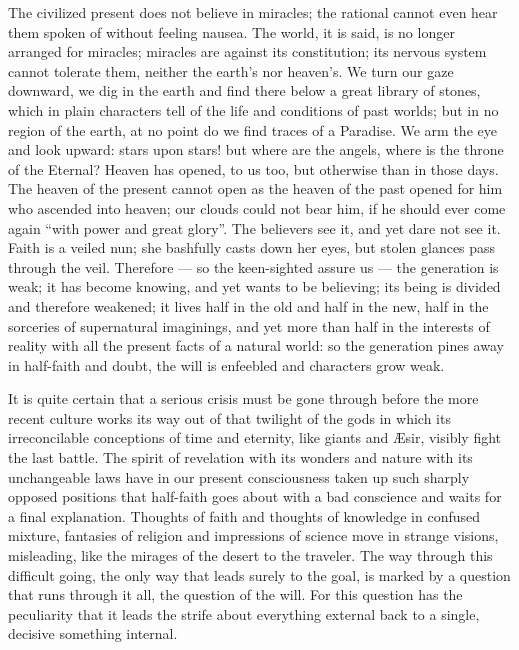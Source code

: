 \documentclass[12pt,a4paper,openany]{book}
\newcommand{\opage}[1]{\marginnote{\footnotesize\textit{[#1]}}}
\begin{document}
The civilized present does not believe in miracles; the
rational cannot even hear them spoken of without
feeling nausea. The world, it is said, is no longer arranged
for miracles; miracles are against its constitution;
its nervous system cannot tolerate them, neither the earth's nor
heaven's. We turn our gaze downward, we dig
in the earth and find there below a great library of stones,
which in plain characters tell of the life and conditions
of past worlds; but in no region of the earth, at no point
do we find traces of a Paradise. We arm the eye and look upward:
stars upon stars! but where are the angels, where is
the throne of the Eternal? Heaven has opened, to
us too, but otherwise than in those days. The heaven of the present
cannot open as the heaven of the past opened for him who
ascended into heaven; our clouds could not bear him, if
he should ever come again ``with power and great
glory''. The believers see it, and yet dare not see
\setcounter{footnote}{0}%
\opage{50}it. Faith is a veiled nun; she bashfully casts down
her eyes, but stolen glances pass through the veil. Therefore
--- so the keen-sighted assure us --- the generation is weak;
it has become knowing, and yet wants to be believing; its
being is divided and therefore weakened; it lives half in the
old and half in the new, half in the sorceries of
supernatural imaginings, and yet more than half in the
interests of reality with all the present
facts of a natural world: so the generation pines away in half-faith and
doubt, the will is enfeebled and characters grow weak.

It is quite certain that a serious crisis must be
gone through before the more recent culture works its way
out of that twilight of the gods in which its irreconcilable conceptions
of time and eternity, like giants and Æsir, visibly
fight the last battle. The spirit of revelation with
its wonders and nature with its unchangeable laws have
in our present consciousness taken up such sharply opposed positions
that half-faith goes about with a bad conscience and waits
for a final explanation. Thoughts of faith and thoughts of knowledge in
confused mixture, fantasies of religion and impressions of
science move in strange visions, misleading, like
the mirages of the desert to the traveler. The way through
this difficult going, the only way that leads surely to the goal,
is marked by a question that runs through it all, the question
of the will. For this question has the
peculiarity that it leads the strife about everything external
back to a single, decisive something internal.
\end{document}
